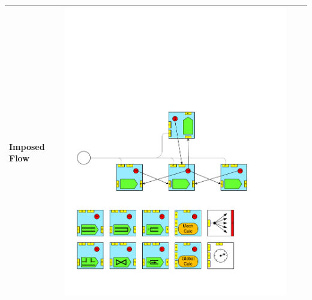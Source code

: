 \begin{table}
\begin{center}
\begin{tabular}{|p{2cm}|c|p{2cm}|c|}
Imposed Flow 			&\includegraphics[page=14, scale=0.25]{./figs/1dcfd/ElementalProcessors.pdf} \\ \hline

\end{tabular}
\end{center}
\end{table}
